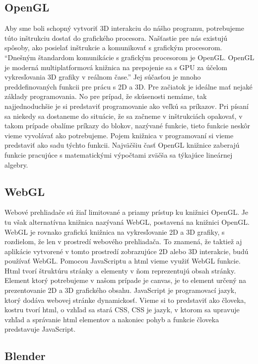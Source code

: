 \documentclass[10pt,oneside,slovak,a4paper]{article}
\begin{document}
\subsection{OpenGL}

Aby sme boli schopný vytvoriť 3D interakciu do nášho programu, potrebujeme túto inštrukciu dostať do grafického procesora.
Našťastie pre nás existujú spôsoby, ako posielať inštrukcie a komunikovať s grafickým procesorom.
“Dnešným štandardom komunikácie s grafickým procesorom je OpenGL. OpenGL je moderná multiplatformová knižnica na prepojenie sa s GPU za účelom vykresľovania 3D grafiky v reálnom čase.” \cite{Graphics-openGL}
Jej súčasťou je mnoho preddefinovaných funkcii pre prácu s 2D a 3D. Pre začiatok je ideálne mať nejaké základy programovania.
No pre prípad, že skúsenosti nemáme, tak najjednoduchšie je si predstaviť programovanie ako veľkú sa príkazov.
Pri písaní sa niekedy sa dostaneme do situácie, že sa začneme v inštrukciách opakovať, v takom prípade obalíme príkazy do blokov, nazývané funkcie, tieto funkcie neskôr vieme vyvolávať ako potrebujeme.
Pojem knižnica v programovaní si vieme predstaviť ako sadu týchto funkcii. Najväčšiu časť OpenGL knižnice zaberajú funkcie pracujúce s matematickými výpočtami zväčša sa týkajúce lineárnej algebry.

\subsection{WebGL}

Webové prehliadače sú žiaľ limitované a priamy prístup ku knižnici OpenGL. Je tu však alternatívna knižnica nazývaná WebGL, postavená na knižnici OpenGL.
WebGL je rovnako grafická knižnica na vykresľovanie 2D a 3D grafiky, s rozdielom, že len v prostredí webového prehliadača.
To znamená, že taktiež aj aplikácie vytvorené v tomto prostredí zobrazujúce 2D alebo 3D interakcie, budú používať WebGL.
Pomocou JavaScriptu a html vieme využiť WebGL funkcie. Html tvorí štruktúru stránky a elementy v ňom reprezentujú obsah stránky.
Element ktorý potrebujeme v našom prípade je canvas, je to element určený na prezentovanie 2D a 3D grafického obsahu. JavaScript je programovací jazyk, ktorý dodáva webovej stránke dynamickosť.
Vieme si to predstaviť ako človeka, kostru tvorí html, o vzhľad sa stará CSS,  CSS je jazyk, v ktorom sa upravuje vzhľad a správanie html elementov a nakoniec pohyb a funkcie človeka predstavuje JavaScript.

\subsection{Blender}
\end{document}
